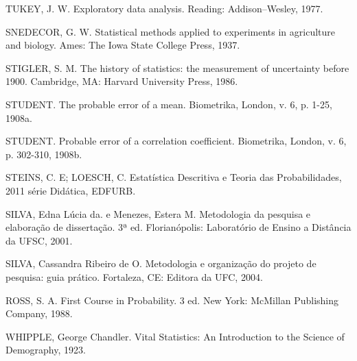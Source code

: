 TUKEY, J. W. Exploratory data analysis. Reading: Addison–Wesley, 1977.\vskip0.3cm

SNEDECOR, G. W. Statistical methods applied to experiments in agriculture and biology. Ames: The Iowa State College Press, 1937. \vskip0.3cm

STIGLER, S. M. The history of statistics: the measurement of uncertainty before 1900. Cambridge, MA: Harvard University Press, 1986. \vskip0.3cm

STUDENT. The probable error of a mean. Biometrika, London, v. 6, p. 1-25, 1908a.\vskip0.3cm

STUDENT. Probable error of a correlation coefficient. Biometrika, London, v. 6, p. 302-310, 1908b.\vskip0.3cm

STEINS, C. E; LOESCH, C. Estatística Descritiva e Teoria das Probabilidades, 2011 série Didática, EDFURB.\vskip0.3cm

SILVA, Edna Lúcia da. e Menezes, Estera M. Metodologia da pesquisa e elaboração de dissertação. 3ª ed. Florianópolis: Laboratório de Ensino a Distância da UFSC, 2001.\vskip0.3cm

SILVA, Cassandra Ribeiro de O. Metodologia e organização do projeto de pesquisa: guia prático. Fortaleza, CE: Editora da UFC, 2004.\vskip0.3cm

ROSS, S. A. First Course in Probability. 3 ed. New York:
McMillan Publishing Company, 1988.\vskip0.3cm


WHIPPLE, George Chandler. Vital Statistics: An Introduction to the Science of Demography, 1923. 







